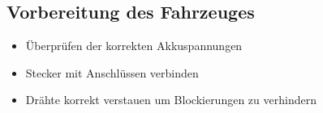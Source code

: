 \subsection{Vorbereitung des Fahrzeuges}
\begin{itemize}
\item Überprüfen der korrekten Akkuspannungen
\item Stecker mit Anschlüssen verbinden
\item Drähte korrekt verstauen um Blockierungen zu verhindern 
\end{itemize}
